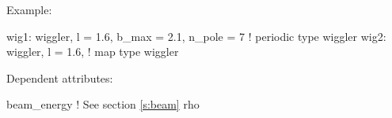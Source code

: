 \vskip0.05in \noindent
Example:
\begin{example}
  wig1: wiggler, l = 1.6, b_max = 2.1, n_pole = 7  ! periodic type wiggler
  wig2: wiggler, l = 1.6,                          ! map type wiggler

\end{example}

\vskip0.05in \noindent
Dependent attributes:
\begin{example}
  beam\_energy  ! See section \ref{s:beam}
  rho
\end{example}
\noindent

